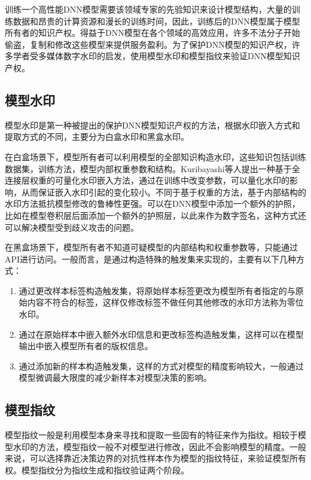 训练一个高性能DNN模型需要该领域专家的先验知识来设计模型结构，大量的训练数据和昂贵的计算资源和漫长的训练时间，因此，训练后的DNN模型属于模型所有者的知识产权。得益于DNN模型在各个领域的高效应用，许多不法分子开始偷盗，复制和修改这些模型来提供服务盈利。为了保护DNN模型的知识产权，许多学者受多媒体数字水印的启发，使用模型水印和模型指纹来验证DNN模型知识产权。

\subsection{模型水印}

模型水印是第一种被提出的保护DNN模型知识产权的方法，根据水印嵌入方式和提取方式的不同，主要分为白盒水印和黑盒水印。

在白盒场景下，模型所有者可以利用模型的全部知识构造水印，这些知识包括训练数据集，训练方法，模型内部权重参数和结构。Kuribayashi等人\cite{kuribayashi2020deepwatermark}提出一种基于全连接层权重的可量化水印嵌入方法，通过在训练中改变参数，可以量化水印的影响，从而保证嵌入水印引起的变化较小。不同于基于权重的方法，基于内部结构的水印方法抵抗模型修改的鲁棒性更强。可以在DNN模型中添加一个额外的护照\cite{fan2019rethinking}，比如在模型卷积层后面添加一个额外的护照层，以此来作为数字签名，这种方式还可以解决模型受到歧义攻击的问题。

在黑盒场景下，模型所有者不知道可疑模型的内部结构和权重参数等，只能通过API进行访问。一般而言，是通过构造特殊的触发集来实现的，主要有以下几种方式：

\begin{enumerate}
	\renewcommand{\labelenumi}{\theenumi)}
	\item 通过更改样本标签构造触发集，将原始样本标签更改为模型所有者指定的与原始内容不符合的标签，这样仅修改标签不做任何其他修改的水印方法称为零位水印。
	\item 通过在原始样本中嵌入额外水印信息和更改标签构造触发集，这样可以在模型输出中嵌入模型所有者的版权信息。
	\item 通过添加新的样本构造触发集，这样的方式对模型的精度影响较大，一般通过模型微调最大限度的减少新样本对模型决策的影响。
\end{enumerate}


\subsection{模型指纹}

模型指纹一般是利用模型本身来寻找和提取一些固有的特征来作为指纹。相较于模型水印的方法，模型指纹一般不对模型进行修改，因此不会影响模型的精度。一般来说，可以选择靠近决策边界的对抗性样本作为模型的指纹特征，来验证模型所有权。模型指纹分为指纹生成和指纹验证两个阶段。

